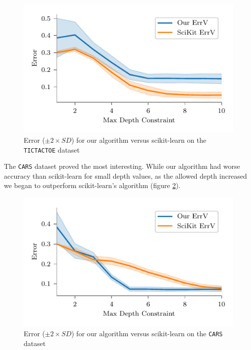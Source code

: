 \documentclass[screen, authorversion, nonacm, sigconf]{acmart}
\begin{document}
\begin{figure}
  \centering
  \includegraphics[width=\columnwidth]{figures/chart_ours_v_scikit_variance_tictactoe.pdf}
  \caption{Error ($\pm 2 \times SD$) for our algorithm versus scikit-learn on the \texttt{TICTACTOE} dataset}
  \label{fig:tttoursvscikit}
\end{figure}

The \texttt{CARS} dataset proved the most interesting. While our algorithm had worse accuracy than scikit-learn for small depth values, as the allowed depth increased we began to outperform scikit-learn's algorithm (figure \ref{fig:caroursvscikit}).

\begin{figure}
  \centering
  \includegraphics[width=\columnwidth]{figures/chart_ours_v_scikit_variance_car.pdf}
  \caption{Error ($\pm 2 \times SD$) for our algorithm versus scikit-learn on the \texttt{CARS} dataset}
  \label{fig:caroursvscikit}
\end{figure}
\end{document}
